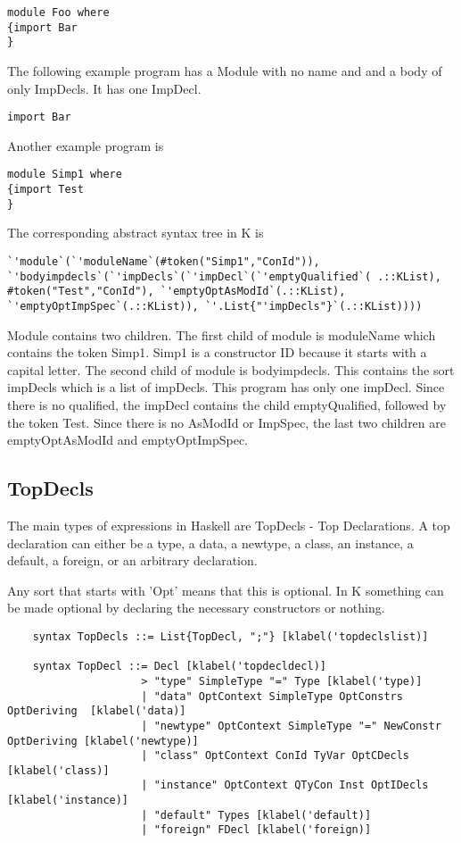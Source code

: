 \begin{lstlisting}
module Foo where
{import Bar
}
\end{lstlisting}

The following example program has a Module with no name and and a body of only ImpDecls. It has one ImpDecl.

\begin{lstlisting}
import Bar
\end{lstlisting}

Another example program is
\begin{lstlisting}
module Simp1 where
{import Test
}
\end{lstlisting}

The corresponding abstract syntax tree in K is
\begin{lstlisting}
`'module`(`'moduleName`(#token("Simp1","ConId")), `'bodyimpdecls`(`'impDecls`(`'impDecl`(`'emptyQualified`( .::KList), #token("Test","ConId"), `'emptyOptAsModId`(.::KList), `'emptyOptImpSpec`(.::KList)), `'.List{"'impDecls"}`(.::KList))))
\end{lstlisting}

Module contains two children. The first child of module is moduleName which contains the token Simp1. Simp1 is a constructor ID because it starts with a capital letter. The second child of module is bodyimpdecls. This contains the sort impDecls which is a list of impDecls. This program has only one impDecl. Since there is no qualified, the impDecl contains the child emptyQualified, followed by the token Test. Since there is no AsModId or ImpSpec, the last two children are emptyOptAsModId and emptyOptImpSpec.

\subsection{TopDecls}
The main types of expressions in Haskell are TopDecls - Top Declarations. A top declaration can either be a type, a data, a newtype, a class, an instance, a default, a foreign, or an arbitrary declaration.

Any sort that starts with 'Opt' means that this is optional. In K something can be made optional by declaring the necessary constructors or nothing.

\begin{lstlisting}
    syntax TopDecls ::= List{TopDecl, ";"} [klabel('topdeclslist)]

    syntax TopDecl ::= Decl [klabel('topdecldecl)]
                     > "type" SimpleType "=" Type [klabel('type)]
                     | "data" OptContext SimpleType OptConstrs OptDeriving  [klabel('data)]
                     | "newtype" OptContext SimpleType "=" NewConstr OptDeriving [klabel('newtype)]
                     | "class" OptContext ConId TyVar OptCDecls [klabel('class)]
                     | "instance" OptContext QTyCon Inst OptIDecls [klabel('instance)]
                     | "default" Types [klabel('default)]
                     | "foreign" FDecl [klabel('foreign)]
\end{lstlisting}

